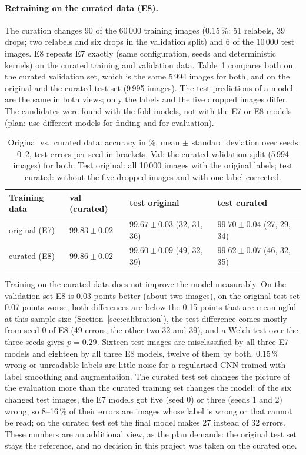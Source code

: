 \documentclass[11pt,a4paper]{article}
\newcommand{\1}{\mathbf{1}}
\begin{document}
\paragraph{Retraining on the curated data (E8).} The curation changes 90 of the 60\,000 training
images (0.15\,\%: 51 relabels, 39 drops; two relabels and six drops in the validation
split) and 6 of the
10\,000 test images. E8 repeats E7 exactly (same configuration, seeds and deterministic kernels)
on the curated training and validation data. Table~\ref{tab:curated} compares both on the
curated validation set, which is the same 5\,994 images for both, and on the original and the
curated test set (9\,995 images). The test predictions of a model are the same in both views;
only the labels and the five dropped images differ. The candidates were found with the fold
models, not with the E7 or E8 models (plan: use different models for finding and for
evaluation).

\begin{table}[t]
  \centering
  \small
  \caption{Original vs.\ curated data: accuracy in \%, mean $\pm$ standard deviation over seeds
    0--2, test errors per seed in brackets. Val: the curated validation split (5\,994 images) for
    both. Test original: all 10\,000 images with the original labels; test curated: without the
    five dropped images and with one label corrected.}
  \label{tab:curated}
  \begin{tabular}{llll}
    \toprule
    Training data & val (curated) & test original & test curated \\
    \midrule
    original (E7) & $99.83 \pm 0.02$ & $99.67 \pm 0.03$ (32, 31, 36) & $99.70 \pm 0.04$ (27, 29, 34) \\
    curated (E8) & $99.86 \pm 0.02$ & $99.60 \pm 0.09$ (49, 32, 39) & $99.62 \pm 0.07$ (46, 32, 35) \\
    \bottomrule
  \end{tabular}
\end{table}

Training on the curated data does not improve the model measurably. On the validation set E8 is
0.03 points better (about two images), on the original test set 0.07 points worse; both
differences are below the 0.15 points that are meaningful at this sample size
(Section~\ref{sec:calibration}), the test difference comes mostly from seed 0 of E8 (49 errors,
the other two 32 and 39), and a Welch test over the three seeds gives $p = 0.29$. Sixteen test
images are misclassified by all three E7 models and eighteen by all three E8 models, twelve of
them by both. 0.15\,\% wrong or unreadable labels are little noise for a regularised CNN
trained with label smoothing and augmentation. The curated test set changes the picture of the evaluation more than the
curated training set changes the model: of the six changed test images, the E7 models got five
(seed 0) or three (seeds 1 and 2) wrong, so 8--16\,\% of their errors are images whose label is
wrong or that cannot be read; on the curated test set the final model makes 27 instead of 32
errors. These numbers are an additional view, as the plan demands: the original test set stays
the reference, and no decision in this project was taken on the curated one.
\end{document}
